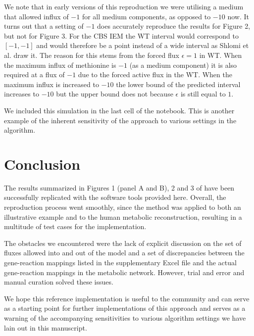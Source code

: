 \documentclass[10pt,a4paper,onecolumn]{article}
\begin{document}
We note that in early versions of this reproduction we were utilising a
medium that allowed influx of \(-1\) for all medium components, as
opposed to \(-10\) now. It turns out that a setting of \(-1\) does
accurately reproduce the results for Figure 2, but not for Figure 3. For
the CBS IEM the WT interval would correspond to \([-1,-1]\) and would
therefore be a point instead of a wide interval as Shlomi et al. draw
it. The reason for this stems from the forced flux \(\epsilon = 1\) in
WT. When the maximum influx of methionine is \(-1\) (as a medium
component) it is also required at a flux of \(-1\) due to the forced
active flux in the WT. When the maximum influx is increased to \(-10\)
the lower bound of the predicted interval increases to \(-10\) but the
upper bound does not because \(\epsilon\) is still equal to \(1\).

We included this simulation in the last cell of the notebook. This is
another example of the inherent sensitivity of the approach to various
settings in the algorithm.

\section{Conclusion}\label{conclusion}

The results summarized in Figures 1 (panel A and B), 2 and 3 of
\autocite{Shlomi2009} have been successfully replicated with the
software tools provided here. Overall, the reproduction process went
smoothly, since the method was applied to both an illustrative example
and to the human metabolic reconstruction, resulting in a multitude of
test cases for the implementation.

The obstacles we encountered were the lack of explicit discussion on the
set of fluxes allowed into and out of the model and a set of
discrepancies between the gene-reaction mappings listed in the
supplementary Excel file and the actual gene-reaction mappings in the
metabolic network. However, trial and error and manual curation solved
these issues.

We hope this reference implementation is useful to the community and can
serve as a starting point for further implementations of this approach
and serves as a warning of the accompanying sensitivities to various
algorithm settings we have lain out in this manuscript.

{\sffamily \small
  \printbibliography[title=References]
}
\end{document}
